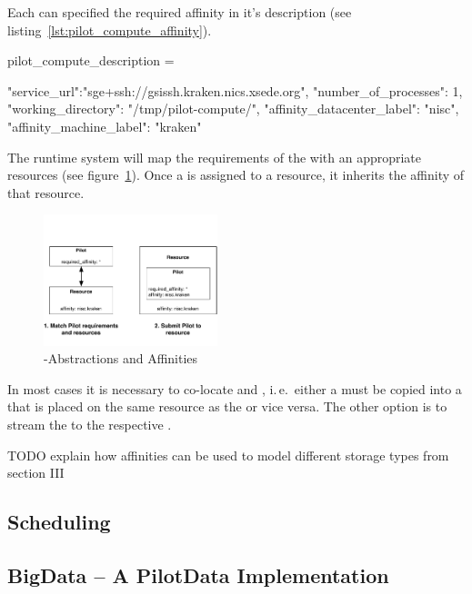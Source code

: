 \documentclass[conference]{IEEEtran}
\begin{document}
Each \pilot can specified the required affinity in it's description (see
listing~\ref{lst:pilot_compute_affinity}).

\begin{code}[
caption={Creation of a \textit{PilotCompute} on the specified  compute
resource endpoint.},
label={lst:pilot_compute_affinity}]
pilot_compute_description = 

{
    "service_url":"sge+ssh://gsissh.kraken.nics.xsede.org",
    "number_of_processes": 1,                             
    "working_directory": "/tmp/pilot-compute/",
    "affinity_datacenter_label": "nisc",              
    "affinity_machine_label": "kraken" 
}
\end{code}

The runtime system will map the requirements of the \pilot with an appropriate
resources (see figure~\ref{fig:figures_pilot-affinities}). Once a \pilot is
assigned to a resource, it inherits the affinity of that resource.

\begin{figure}[t]
	\centering
	\includegraphics[width=0.45\textwidth]{figures/pilot-affinities.pdf}
	\caption{\pilot-Abstractions and Affinities}
	\label{fig:figures_pilot-affinities}
\end{figure}


In most cases it is necessary to co-locate \cus and \dus, i.\,e.\ either a \du
must be copied into a \pd that is placed on the same resource as the \pj or
vice versa. The other option is to stream the \du to the respective \cu.

TODO
explain how affinities can be used to model different storage types from section III

\subsection{Scheduling}




\subsection{BigData -- A PilotData Implementation}
\end{document}
